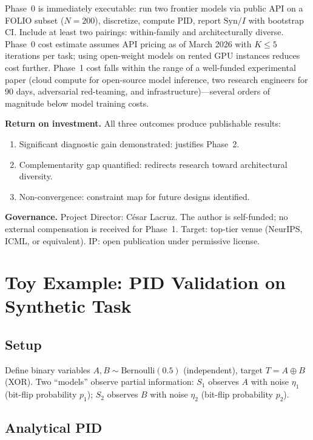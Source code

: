 \documentclass[11pt,a4paper]{article}
\theoremstyle{definition}
\begin{document}
Phase~0 is immediately executable: run two frontier models via public API on a FOLIO subset ($N=200$), discretize, compute PID, report $\mathrm{Syn}/I$ with bootstrap CI. Include at least two pairings: within-family and architecturally diverse. Phase~0 cost estimate assumes API pricing as of March 2026 with $K \leq 5$ iterations per task; using open-weight models on rented GPU instances reduces cost further. Phase~1 cost falls within the range of a well-funded experimental paper (cloud compute for open-source model inference, two research engineers for 90 days, adversarial red-teaming, and infrastructure)---several orders of magnitude below model training costs.

\textbf{Return on investment.} All three outcomes produce publishable results:
\begin{enumerate}[leftmargin=*,itemsep=2pt]
\item Significant diagnostic gain demonstrated: justifies Phase~2.
\item Complementarity gap quantified: redirects research toward architectural diversity.
\item Non-convergence: constraint map for future designs identified.
\end{enumerate}

\textbf{Governance.} Project Director: C\'esar Lacruz. The author is self-funded; no external compensation is received for Phase~1. Target: top-tier venue (NeurIPS, ICML, or equivalent). IP: open publication under permissive license.


\section{Toy Example: PID Validation on Synthetic Task}
\label{app:toy}

\subsection{Setup}

Define binary variables $A, B \sim \text{Bernoulli}(0.5)$ (independent), target $T = A \oplus B$ (XOR). Two ``models'' observe partial information: $S_1$ observes $A$ with noise $\eta_1$ (bit-flip probability $p_1$); $S_2$ observes $B$ with noise $\eta_2$ (bit-flip probability $p_2$).

\subsection{Analytical PID}
\end{document}
